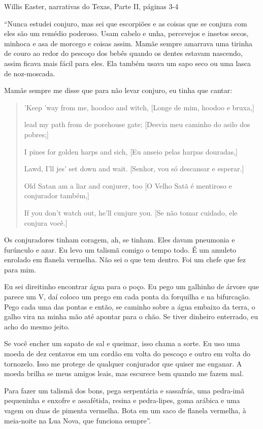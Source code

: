 Willis Easter, narrativas do Texas, Parte II, páginas 3-4

``Nunca estudei conjuro, mas sei que escorpiões e as coisas que se
conjura com eles são um remédio poderoso. Usam cabelo e unha, percevejos
e insetos secos, minhoca e asa de morcego e coisas assim. Mamãe sempre
amarrava uma tirinha de couro ao redor do pescoço dos bebês quando os
dentes estavam nascendo, assim ficava mais fácil para eles. Ela também
usava um sapo seco ou uma lasca de noz-moscada.

Mamãe sempre me disse que para não levar conjuro, eu tinha que cantar:

\begin{quote}
'Keep 'way from me, hoodoo and witch, {[}Longe de mim, hoodoo e
bruxa,{]}

lead my path from de porehouse gate; {[}Desvia meu caminho do asilo dos
pobres;{]}

I pines for golden harps and sich, {[}Eu anseio pelas harpas
douradas,{]}

Lawd, I'll jes' set down and wait. {[}Senhor, vou só descansar e
esperar.{]}

Old Satan am a liar and conjurer, too {[}O Velho Satã é mentiroso e
conjurador também,{]}

If you don't watch out, he'll cunjure you. {[}Se não tomar cuidado, ele
conjura você.{]}
\end{quote}

Os conjuradores tinham coragem, ah, se tinham. Eles davam pneumonia e
furúnculo e azar. Eu levo um talismã comigo o tempo todo. É um amuleto
enrolado em flanela vermelha. Não sei o que tem dentro. Foi um chefe que
fez para mim.

Eu sei direitinho encontrar água para o poço. Eu pego um galhinho de
árvore que parece um V, daí coloco um prego em cada ponta da forquilha e
na bifurcação. Pego cada uma das pontas e então, se caminho sobre a água
embaixo da terra, o galho vira na minha mão até apontar para o chão. Se
tiver dinheiro enterrado, eu acho do mesmo jeito.

Se você encher um sapato de sal e queimar, isso chama a sorte. Eu uso
uma moeda de dez centavos em um cordão em volta do pescoço e outro em
volta do tornozelo. Isso me protege de qualquer conjurador que quiser me
enganar. A moeda brilha se meus amigos leais, mas escurece bem quando me
fazem mal.

Para fazer um talismã dos bons, pega serpentária e sassafrás, uma
pedra-imã pequeninha e enxofre e assafétida, resina e pedra-lipes, goma
arábica e uma vagem ou duas de pimenta vermelha. Bota em um saco de
flanela vermelha, à meia-noite na Lua Nova, que funciona sempre''.

